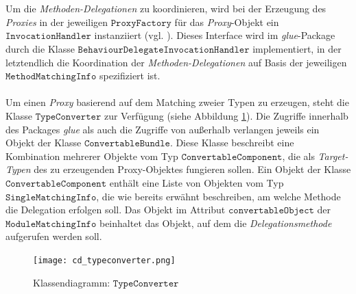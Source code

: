 \\\\
Um die \emph{Methoden-Delegationen} zu koordinieren, wird bei der Erzeugung des \emph{Proxies} in der jeweiligen $\texttt{ProxyFactory}$ für das \emph{Proxy}-Objekt ein $\texttt{InvocationHandler}$ instanziiert (vgl. \cite{invocationhandler}). Dieses \Gls{Interface} wird im \emph{glue}-Package durch die Klasse $\texttt{BehaviourDelegateInvocationHandler}$ implementiert, in der letztendlich die Koordination der \emph{Methoden-Delegationen} auf Basis der jeweiligen $\texttt{MethodMatchingInfo}$ spezifiziert ist.
\\\\
Um einen \emph{Proxy} basierend auf dem Matching zweier Typen zu erzeugen, steht die Klasse $\texttt{TypeConverter}$ zur Verfügung (siehe Abbildung \ref{cd_typeconverter}). Die Zugriffe innerhalb des Packages \emph{glue} als auch die Zugriffe von außerhalb verlangen jeweils ein Objekt der Klasse $\texttt{ConvertableBundle}$. Diese Klasse beschreibt eine Kombination mehrerer Objekte vom Typ $\texttt{ConvertableComponent}$, die als \emph{Target-Typen} des zu erzeugenden Proxy-Objektes fungieren sollen. Ein Objekt der Klasse $\texttt{ConvertableComponent}$ enthält eine Liste von Objekten vom Typ $\texttt{SingleMatchingInfo}$, die wie bereits erwähnt beschreiben, am welche Methode die Delegation erfolgen soll. Das Objekt im Attribut $\texttt{convertableObject}$ der $\texttt{ModuleMatchingInfo}$ beinhaltet das Objekt, auf dem die \emph{Delegationsmethode} aufgerufen werden soll.
\begin{figure}[h!]
\texttt{[image: cd\_typeconverter.png]}
\caption{Klassendiagramm: $\texttt{TypeConverter}$}
\label{cd_typeconverter}
\end{figure}

